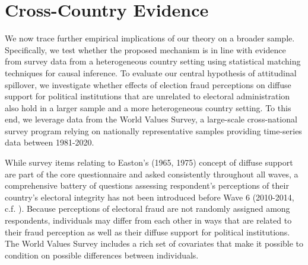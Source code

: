 \documentclass[11pt, ngerman,english,a4]{article}
\begin{document}
\section*{Cross-Country Evidence}
We now trace further empirical implications of our theory on a broader sample. Specifically, we test whether the proposed mechanism is in line with evidence from survey data from a heterogeneous country setting using statistical matching techniques for causal inference. To evaluate our central hypothesis of attitudinal spillover, we investigate whether effects of election fraud perceptions on diffuse support for political institutions that are unrelated to electoral administration also hold in a larger sample and a more heterogeneous country setting. To this end, we leverage data from the World Values Survey, a large-scale cross-national survey program relying on nationally representative samples providing time-series data between 1981-2020. 

While survey items relating to Easton’s (1965, 1975) concept of diffuse support are part of the core questionnaire and asked consistently throughout all waves, a comprehensive battery of questions assessing respondent’s perceptions of their country’s electoral integrity has not been introduced before Wave 6 (2010-2014, c.f. \citealt{Norris2014}). Because perceptions of electoral fraud are not randomly assigned among respondents, individuals may differ from each other in ways that are related to their fraud perception as well as their diffuse support for political institutions. The World Values Survey includes a rich set of covariates that make it possible to condition on possible differences between individuals. 
\end{document}
